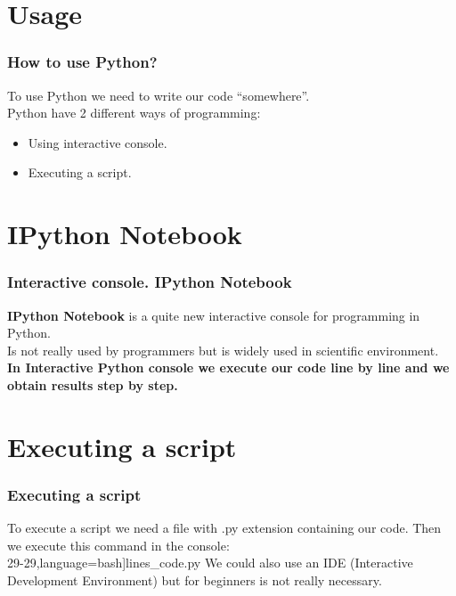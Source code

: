 \section{Usage}

\begin{frame}

\frametitle{How to use Python?}

{\normalsize To use Python we need to write our code “somewhere”.\\}
\vspace{1em}
{\normalsize Python have 2 different ways of programming:\\}
\vspace{1em}
\begin{itemize}
	\item Using interactive console.
	\item Executing a script.
\end{itemize}

\end{frame}

\section{IPython Notebook}
\begin{frame}
\frametitle{Interactive console. IPython Notebook}

{\normalsize \textbf{IPython Notebook} is a quite new interactive console for programming in Python.\\}
\vspace{1em}
{\normalsize Is not really used by programmers but is widely used in scientific environment.\\}
\vspace{2em}
\textbf{{\normalsize In Interactive Python console we execute our code line by line and we obtain results step by step.\\}} 
\end{frame}

\section{Executing a script}
\begin{frame}
\frametitle{Executing a script}
{\normalsize To execute a script we need a file with .py extension containing our code. Then we  execute this command  in the console:\\}
\vspace{1em}
{29-29},language=bash]{lines_code.py}
\vspace{1em}
{\normalsize We could also use an IDE (Interactive Development Environment) but for beginners is not really necessary.}
\end{frame}

\ThankYouFrame

